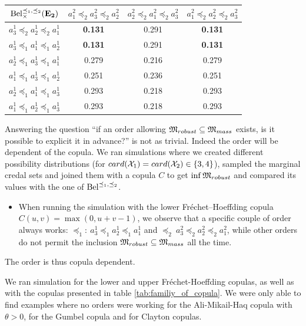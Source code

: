 \begin{example}
\begin{center}
\begin{tabular}{|c||c|c|c|}
\hline
${\mathrm{Bel}}^{\preceq_1,\preceq_2}_\times(\mathbf{E_2})$ & $a^2_1\preceq_2a^2_3\preceq_2a^2_2$ & $a^2_2\preceq_2a^2_1\preceq_2a^2_3$ & $a^2_1\preceq_2a^2_2\preceq_2a^2_3$ \\ \hline\hline
$a^1_3\preceq_2a^1_2\preceq_2a^1_1$ & \textbf{0.131} & 0.291 & \textbf{0.131} \\ \hline
$a^1_3\preceq_1a^1_1\preceq_1a^1_2$ & \textbf{0.131} & 0.291 & \textbf{0.131} \\ \hline
$a^1_2\preceq_1a^1_3\preceq_1a^1_1$ & 0.279 & 0.216 & 0.279 \\ \hline
$a^1_1\preceq_1a^1_3\preceq_1a^1_2$ & 0.251 & 0.236 & 0.251 \\ \hline
$a^1_2\preceq_1a^1_1\preceq_1a^1_3$ & 0.293 & 0.218 & 0.293 \\ \hline
$a^1_1\preceq_1a^1_2\preceq_1a^1_3$ & 0.293 & 0.218 & 0.293 \\ \hline
\end{tabular}
\label{tab:beliefs_orders}
\end{center}

Answering the question ``if an order allowing ${\mathfrak{M}}_{robust}\subseteq{\mathfrak{M}}_{mass}$ exists, is it possible to explicit it in advance?'' is not as trivial. Indeed the order will be dependent of the copula. We ran simulations where we created different possibility distributions (for $card({\mathcal{X}}_1)=card({\mathcal{X}}_2)\in\{3,4\}$), sampled the marginal credal sets and joined them with a copula $C$ to get $\inf{\mathfrak{M}}_{robust}$ and compared its values with the one of ${\mathrm{Bel}}^{\preceq_1,\preceq_2}$.
\begin{itemize}
	\item When running the simulation with the lower Fréchet–Hoeffding copula $C(u,v)=\max(0,u+v-1)$, we observe that a specific couple of order always works: $\preceq_1:~a^1_3\preceq_1a^1_2\preceq_1a^1_1$ and $\preceq_2~a^2_3\preceq_2a^2_2\preceq_2a^2_1$, while other orders do not permit the inclusion ${\mathfrak{M}}_{robust}\subseteq{\mathfrak{M}}_{mass}$ all the time.
\end{itemize}
The order is thus copula dependent.

We ran simulation for the lower and upper Fréchet-Hoeffding copulas, as well as with the copulas presented in table \ref{tab:familiy_of_copula}. We were only able to find examples where no orders were working for the Ali-Mikail-Haq copula with $\theta>0$, for the Gumbel copula and for Clayton copulas. 
\end{example}
\pagebreak